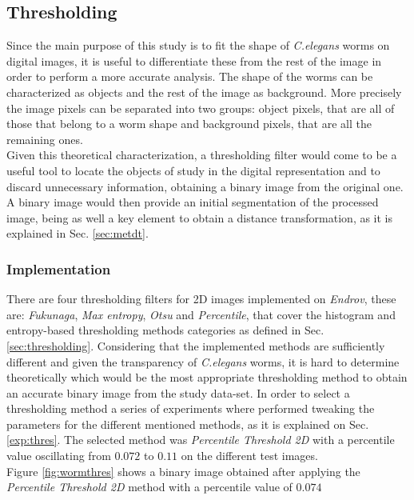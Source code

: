   

\subsection{Thresholding}
\label{sec:metthres}

Since the main purpose of this study is to fit the shape of \emph{C.elegans} worms on digital
images, it is useful to differentiate these from the rest of the image in order to perform a more 
accurate analysis. The shape of the worms
can be characterized as objects and the rest of the image as background. More precisely
the image pixels can be separated into two groups: object pixels, that are all of those
that belong to a worm shape and background pixels, that are all the remaining ones.\\

Given this theoretical characterization, a thresholding filter would come to be a useful tool 
to locate the objects of study in the digital representation and to discard unnecessary 
information, obtaining a binary image from the original one. A binary image would then provide
an initial segmentation of the processed image, being as well a key element to obtain
a distance transformation, as it is explained in Sec. \ref{sec:metdt}.

\subsubsection{Implementation}
\label{sec:thresimp}
There are four thresholding filters for 2D images implemented on \emph{Endrov}, these are: 
\emph{Fukunaga}, \emph{Max entropy}, \emph{Otsu} and \emph{Percentile}, that cover the 
histogram and entropy-based thresholding methods categories as defined in Sec.\ref{sec:thresholding}.
Considering that the implemented methods are sufficiently different and given the transparency
of \emph{C.elegans} worms, it is hard to determine theoretically which would be the most appropriate 
thresholding method to obtain an accurate binary image from the study data-set. In order 
to select a thresholding method a series of experiments where performed tweaking the parameters
for the different mentioned methods, as it is explained on Sec.\ref{exp:thres}.
The selected method was \emph{Percentile Threshold 2D} with a percentile value oscillating from
$0.072$ to $0.11$ on the different test images.\\

Figure \ref{fig:wormthres} shows a binary image obtained after applying
the \emph{Percentile Threshold 2D} method with a percentile value of $0.074$

